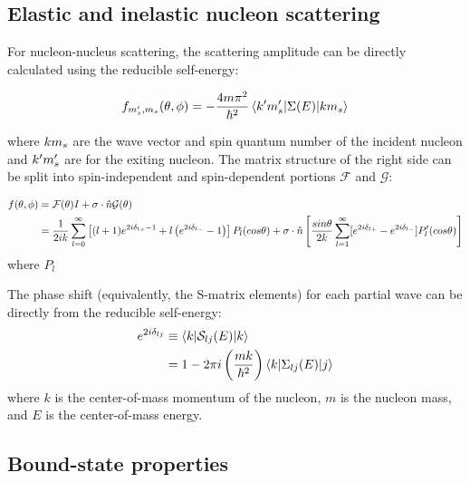 \subsection{Elastic and inelastic nucleon scattering}
For nucleon-nucleus scattering, the scattering amplitude can be directly calculated using the
reducible self-energy:

\begin{equation}
    f_{m'_{s},m_{s}}(\theta,\phi) =
    -\frac{4m\pi^{2}}{\hbar^{2}}\braket{\boldmath{k}'m'_{s}|\Sigma(E)|\boldmath{k}m_{s}}
\end{equation}

\noindent
where $\boldmath{k}m_{s}$ are the wave vector and spin quantum number of the incident nucleon and
$\boldmath{k'}m'_{s}$ are for the exiting nucleon. The matrix structure of the right side can be
split into spin-independent and spin-dependent portions $\mathcal{F}$ and $\mathcal{G}$:

\begin{equation}
    \begin{split}
    f(\theta,\phi) & = \mathcal{F}(\theta)I + \sigma\cdot\boldmath{\hat{n}}\mathcal{G}(\theta)\\
    & = \frac{1}{2ik}\sum_{l=0}^{\infty}\left[(l+1)e^{2i\delta_{l+} - 1} +
    l\left(e^{2i\delta_{l-}}-1\right)\right]P_{l}(cos\theta) +
    \sigma\cdot\boldmath{\hat{n}}\left[\frac{sin\theta}{2k}\sum_{l=1}^{\infty}[e^{2i\delta_{l+}}-e^{2i\delta_{l-}}]P'_{l}(cos\theta)\right]
    \end{split}
\end{equation}
\noindent
where $P_{l}$

The phase shift (equivalently, the S-matrix elements) for each partial wave can be directly from the reducible self-energy:
\begin{equation}
    \begin{split}
        e^{2i\delta_{lj}} & \equiv \braket{k|\mathcal{S}_{lj}(E)|k}\\
        & = 1 - 2\pi i \left(\frac{mk}{\hbar^{2}}\right) \braket{k|\Sigma_{lj}(E)|j}
    \end{split}
\end{equation}
\noindent
where $k$ is the center-of-mass momentum of the nucleon, $m$ is the nucleon mass, and $E$ is the
center-of-mass energy. 
\subsection{Bound-state properties}

